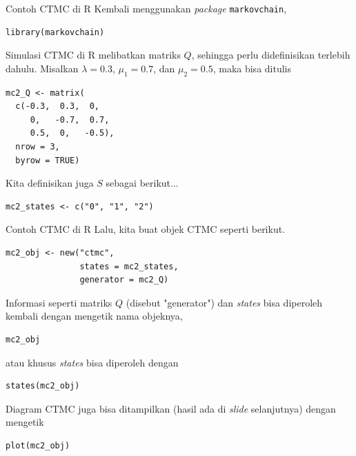 \documentclass{beamer}
\begin{document}
\begin{frame}[fragile]{Contoh CTMC di R}
    Kembali menggunakan \textit{package} \verb|markovchain|,
\begin{verbatim}
library(markovchain)
\end{verbatim}
    Simulasi CTMC di R melibatkan matriks \(Q\), sehingga perlu didefinisikan terlebih dahulu. Misalkan \(\lambda = 0.3\), \(\mu_1 = 0.7\), dan \(\mu_2 = 0.5\), maka bisa ditulis
\begin{verbatim}
mc2_Q <- matrix(
  c(-0.3,  0.3,  0,
     0,   -0.7,  0.7,
     0.5,  0,   -0.5),
  nrow = 3,
  byrow = TRUE)
\end{verbatim}
    Kita definisikan juga \(S\) sebagai berikut...
\begin{verbatim}
mc2_states <- c("0", "1", "2")
\end{verbatim}
\end{frame}

\begin{frame}[fragile]{Contoh CTMC di R}
    Lalu, kita buat objek CTMC seperti berikut.
\begin{verbatim}
mc2_obj <- new("ctmc",
               states = mc2_states,
               generator = mc2_Q)    
\end{verbatim}
    Informasi seperti matriks \(Q\) (disebut "generator") dan \textit{states} bisa diperoleh kembali dengan mengetik nama objeknya,
\begin{verbatim}
mc2_obj
\end{verbatim}
    atau khusus \textit{states} bisa diperoleh dengan
\begin{verbatim}
states(mc2_obj)
\end{verbatim}
    Diagram CTMC juga bisa ditampilkan (hasil ada di \textit{slide} selanjutnya) dengan mengetik
\begin{verbatim}
plot(mc2_obj)
\end{verbatim}
\end{frame}
\end{document}
